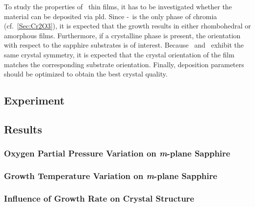 To study the properties of \cro\ thin films, it has to be investigated whether the material can be deposited via \gls{pld}.
Since \textalpha-\cro\ is the only phase of chromia (cf.~\ref{Sec:Cr2O3}), it is expected that the growth results in either rhombohedral or amorphous films.
Furthermore, if a crystalline phase is present, the orientation with respect to the sapphire substrates is of interest.
Because \alo\ and \cro\ exhibit the same crystal symmetry, it is expected that the crystal orientation of the film  matches the corresponding substrate orientation.
Finally, deposition parameters should be optimized to obtain the best crystal quality.

\subsection{Experiment}
    

\subsection{Results}
    \subsubsection{Oxygen Partial Pressure Variation on \textit{m}-plane Sapphire}
        
    \subsubsection{Growth Temperature Variation on \textit{m}-plane Sapphire}
        
    \subsubsection{Influence of Growth Rate on Crystal Structure}
        
